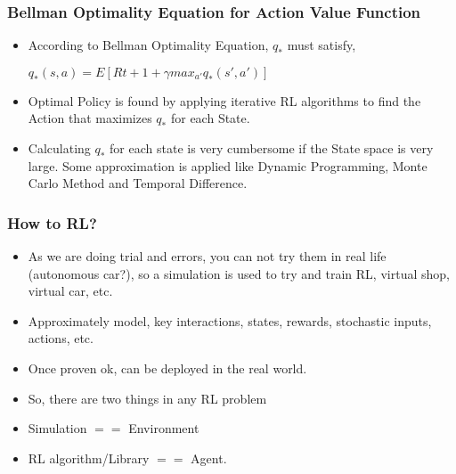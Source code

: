 \begin{frame}[fragile]\frametitle{Bellman Optimality Equation for Action Value Function}

\begin{itemize}
\item According to Bellman Optimality Equation, $q_{*}$ must satisfy,

$q_{*}(s,a) = E[R{t+1} + \gamma max_{a'} q_{*}(s',a')]$

\item Optimal Policy is found by applying iterative RL algorithms to find the Action that maximizes $q_*$ for each State.

\item Calculating $q_*$ for each state is very cumbersome if the State space is very large. Some approximation is applied like Dynamic Programming, Monte Carlo Method and Temporal Difference.
\end{itemize}

\end{frame}




\begin{frame}[fragile]\frametitle{How to RL?}

\begin{itemize}
\item As we are doing trial and errors, you can not try them in real life (autonomous car?), so a simulation is used to try and train RL, virtual shop, virtual car, etc.
\item Approximately model, key interactions, states, rewards, stochastic inputs, actions, etc.
\item Once proven ok, can be deployed in the real world.
\item So, there are two things in any RL problem
\item Simulation $==$ Environment
\item RL algorithm/Library $==$ Agent.
\end{itemize}
\end{frame}

